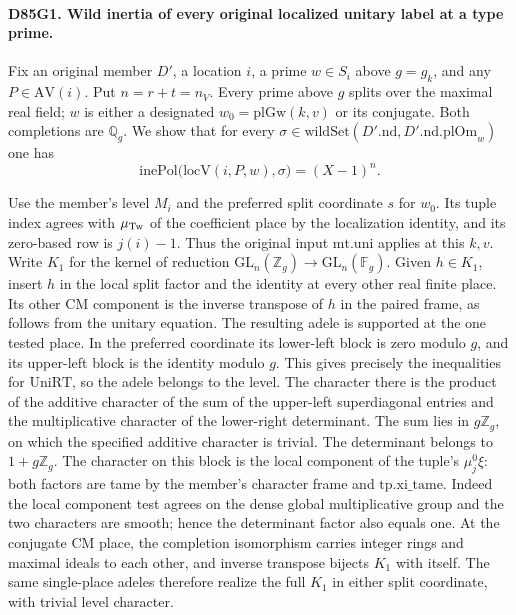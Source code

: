 \paragraph{D85G1. Wild inertia of every original localized unitary label at a type prime.}
Fix an original member $D'$, a location $i$, a prime $w\in S_i$
above $g=g_k$, and any $P\in\mathrm{AV}(i)$. Put $n=r+t=n_V$.
Every prime above $g$ splits over the maximal real field; $w$ is
either a designated $w_0=\mathrm{plGw}(k,v)$ or its conjugate.
Both completions are $\mathbb Q_g$. We show that for every
$\sigma\in\mathrm{wildSet}(D'.\mathrm{nd},D'.\mathrm{nd}.\mathrm{plOm}_w)$
one has
\[
   \mathrm{inePol}\bigl(\mathrm{locV}(i,P,w),\sigma\bigr)=(X-1)^n .
\]

Use the member's level $M_i$ and the preferred split coordinate
$s$ for $w_0$. Its tuple index agrees with $\mu_{\rm Tw}$ of the
coefficient place by the localization identity, and its zero-based
row is $j(i)-1$. Thus the original input $\mathrm{mt}.\mathrm{uni}$
applies at this $k,v$. Write $K_1$ for the kernel of reduction
$\mathrm{GL}_n(\mathbb Z_g)\to\mathrm{GL}_n(\mathbb F_g)$.
Given $h\in K_1$, insert $h$ in the local split factor and the
identity at every other real finite place. Its other CM component
is the inverse transpose of $h$ in the paired frame, as follows
from the unitary equation. The resulting adele is supported at
the one tested place. In the preferred coordinate its lower-left
block is zero modulo $g$, and its upper-left block is the identity
modulo $g$. This gives precisely the inequalities for
$\mathrm{UniRT}$, so the adele belongs to the level.
The character there is the product of the additive character of the
sum of the upper-left superdiagonal entries and the multiplicative
character of the lower-right determinant. The sum lies in
$g\mathbb Z_g$, on which the specified additive character is
trivial. The determinant belongs to $1+g\mathbb Z_g$.
The character on this block is the local component of the tuple's
$\mu^0_j\xi$: both factors are tame by the member's character frame
and $\mathrm{tp}.\mathrm{xi\_tame}$. Indeed the local component
test agrees on the dense global multiplicative group and the two
characters are smooth; hence the determinant factor also equals
one. At the conjugate CM place, the completion isomorphism carries
integer rings and maximal ideals to each other, and inverse
transpose bijects $K_1$ with itself. The same single-place adeles
therefore realize the full $K_1$ in either split coordinate, with
trivial level character.

